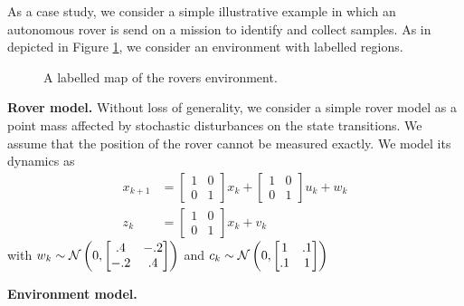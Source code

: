 As a case study, we consider a simple illustrative example in which an autonomous rover is send on a mission to identify and collect samples.
As in depicted in Figure \ref{fig:Scenario}, we consider an environment with labelled regions. 
\begin{figure}

\caption{A labelled map of the rovers environment. }\label{fig:Scenario}
\end{figure}


\textbf{Rover model.} Without loss of generality, we consider a simple rover model as a point mass affected by stochastic disturbances on the state transitions. We assume that the position of the rover cannot be measured exactly. 
We model its dynamics as
\begin{align}
	x_{k+1}&=\begin{bmatrix}
		1&0\\
		0&1
	\end{bmatrix} x_{k} + \begin{bmatrix}
		1&0\\
		0&1
	\end{bmatrix} u_k+ w_k\\
z_k&=\begin{bmatrix}
		1&0\\
		0&1
	\end{bmatrix}x_k+v_k
\end{align}
with $w_k\sim \mathcal{N} \left(0,\begin{bmatrix}.4&-.2\\-.2&.4\end{bmatrix}\right)$ and $c_k\sim \mathcal{N} \left(0,\begin{bmatrix}1&.1\\.1&1\end{bmatrix}\right)$

\begin{figure}
	
\end{figure}
\textbf{Environment model.} 



